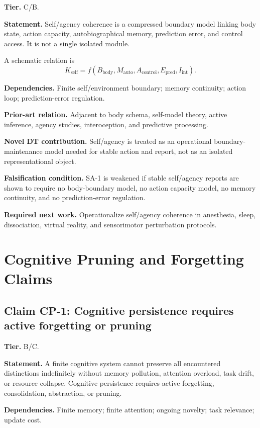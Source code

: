 \documentclass[10pt,a4paper,twocolumn,aps,prl]{revtex4-2}
\theoremstyle{claimstyle}
\theoremstyle{definition}
\newcommand{\claimfield}[1]{\noindent\textbf{#1.}}
\newcommand{\Kself}{K_{\mathrm{self}}}
\newcommand{\Epred}{E_{\mathrm{pred}}}
\begin{document}
\claimfield{Tier} C/B.

\claimfield{Statement} Self/agency coherence is a compressed boundary model linking body state, action capacity, autobiographical memory, prediction error, and control access. It is not a single isolated module.

A schematic relation is
\begin{equation}
\Kself=f(B_{\mathrm{body}},M_{\mathrm{auto}},A_{\mathrm{control}},\Epred,I_{\mathrm{int}}).
\end{equation}

\claimfield{Dependencies} Finite self/environment boundary; memory continuity; action loop; prediction-error regulation.

\claimfield{Prior-art relation} Adjacent to body schema, self-model theory, active inference, agency studies, interoception, and predictive processing.

\claimfield{Novel DT contribution} Self/agency is treated as an operational boundary-maintenance model needed for stable action and report, not as an isolated representational object.

\claimfield{Falsification condition} SA-1 is weakened if stable self/agency reports are shown to require no body-boundary model, no action capacity model, no memory continuity, and no prediction-error regulation.

\claimfield{Required next work} Operationalize self/agency coherence in anesthesia, sleep, dissociation, virtual reality, and sensorimotor perturbation protocols.

\section{Cognitive Pruning and Forgetting Claims}

\subsection{Claim CP-1: Cognitive persistence requires active forgetting or pruning}

\claimfield{Tier} B/C.

\claimfield{Statement} A finite cognitive system cannot preserve all encountered distinctions indefinitely without memory pollution, attention overload, task drift, or resource collapse. Cognitive persistence requires active forgetting, consolidation, abstraction, or pruning.

\claimfield{Dependencies} Finite memory; finite attention; ongoing novelty; task relevance; update cost.
\end{document}

